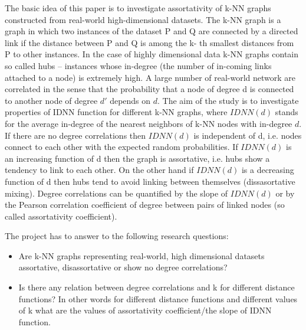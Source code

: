 The basic idea of this paper is to investigate assortativity of k-NN graphs constructed from real-world high-dimensional datasets.
The k-NN graph is a graph in which two instances of the dataset P and Q are connected by a directed link if the distance between P and Q is among the k- th smallest distances from P to other instances.
In the case of highly dimensional data k-NN graphs contain so called hubs – instances whose in-degree (the number of in-coming links attached to a node) is extremely high.
A large number of real-world network are correlated in the sense that the probability that a node of degree d is connected to another node of degree $d'$ depends on $d$.
The aim of the study is to investigate properties of IDNN function for different k-NN graphs, where $IDNN(d)$ stands for the average in-degree of the nearest neighbors of k-NN nodes with in-degree $d$.
If there are no degree correlations then $IDNN(d)$ is independent of d, i.e. nodes connect to each other with the expected random probabilities.
If $IDNN(d)$ is an increasing function of d then the graph is assortative, i.e. hubs show a tendency to link to each other.
On the other hand if $IDNN(d)$ is a decreasing function of d then hubs tend to avoid linking between themselves (dissasortative mixing).
Degree correlations can be quantified by the slope of $IDNN(d)$ or by the Pearson correlation coefficient of degree between pairs of linked nodes (so called assortativity coefficient).

The project has to answer to the following research questions:
\begin{itemize}
\item Are k-NN graphs representing real-world, high dimensional datasets assortative, disassortative or show no degree correlations?
\item Is there any relation between degree correlations and k for different distance functions? In other words for different distance functions and different values of k what are the values of assortativity coefficient/the slope of IDNN function.
\end{itemize}
